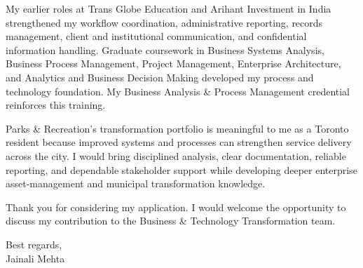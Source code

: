 \documentclass[letterpaper,10pt]{article}
\begin{document}
My earlier roles at Trans Globe Education and Arihant Investment in India strengthened my workflow coordination, administrative reporting, records management, client and institutional communication, and confidential information handling. Graduate coursework in Business Systems Analysis, Business Process Management, Project Management, Enterprise Architecture, and Analytics and Business Decision Making developed my process and technology foundation. My Business Analysis \& Process Management credential reinforces this training.

Parks \& Recreation's transformation portfolio is meaningful to me as a Toronto resident because improved systems and processes can strengthen service delivery across the city. I would bring disciplined analysis, clear documentation, reliable reporting, and dependable stakeholder support while developing deeper enterprise asset-management and municipal transformation knowledge.

Thank you for considering my application. I would welcome the opportunity to discuss my contribution to the Business \& Technology Transformation team.

Best regards,\\[8pt]
Jainali Mehta
\end{document}
